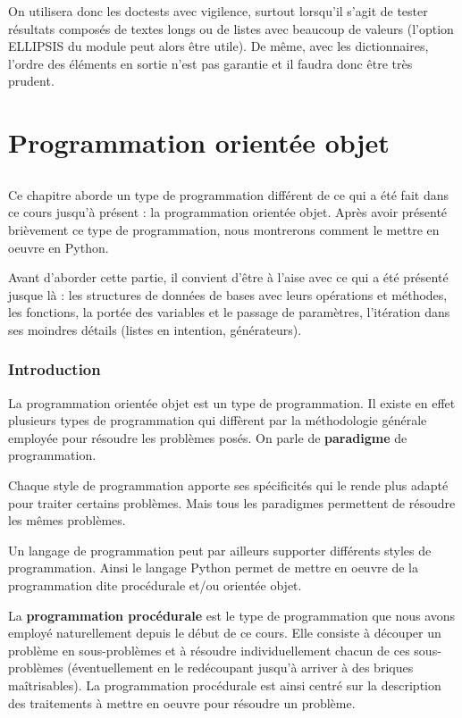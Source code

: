 \documentclass[12pt, a4paper]{article}
\begin{document}
On utilisera donc les doctests avec vigilence, surtout lorsqu'il s'agit de tester résultats composés de textes longs ou de listes avec beaucoup de valeurs (l'option ELLIPSIS du module peut alors être utile). De même, avec les dictionnaires, l'ordre des éléments en sortie n'est pas garantie et il faudra donc être très prudent.



\newpage
\part{Programmation orientée objet}
\label{sec:poo}
\chapter{}

Ce chapitre aborde un type de programmation différent de ce qui a été fait dans ce cours jusqu'à présent : la programmation orientée objet. Après avoir présenté brièvement ce type de programmation, nous montrerons comment le mettre en oeuvre en Python.

Avant d'aborder cette partie, il convient d'être à l'aise avec ce qui a été présenté jusque là : les structures de données de bases avec leurs opérations et méthodes, les fonctions, la portée des variables et le passage de paramètres, l'itération dans ses moindres détails (listes en intention, générateurs).


\section{Introduction}
La programmation orientée objet est un type de programmation. Il existe en effet plusieurs types de programmation qui diffèrent par la méthodologie générale employée pour résoudre les problèmes posés. On parle de \textbf{paradigme} de programmation. 

Chaque style de programmation apporte ses spécificités qui le rende plus adapté pour traiter certains problèmes. Mais tous les paradigmes permettent de résoudre les mêmes problèmes.

Un langage de programmation peut par ailleurs supporter différents styles de programmation. Ainsi le langage Python permet de mettre en oeuvre de la programmation dite procédurale et/ou orientée objet.

La \textbf{programmation procédurale} est le type de programmation que nous avons employé naturellement depuis le début de ce cours. Elle consiste à découper un problème en sous-problèmes et à résoudre individuellement chacun de ces sous-problèmes (éventuellement en le redécoupant jusqu'à arriver à des briques maîtrisables). La programmation procédurale est ainsi centré sur la description des traitements à mettre en oeuvre pour résoudre un problème.
\end{document}
